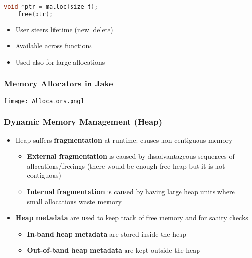 \begin{lstlisting}[language={C}]
    void *ptr = malloc(size_t);
    free(ptr);                  
\end{lstlisting}
\begin{itemize}
    \item User steers lifetime (new, delete)
    \item Available across functions
    \item Used also for large allocations
\end{itemize}

\subsubsection{Memory Allocators in Jake}
\begin{center}
    \texttt{[image: Allocators.png]}
\end{center}

\subsubsection{Dynamic Memory Management (Heap)}
\begin{itemize}
    \item Heap suffers \textbf{fragmentation} at runtime: causes non-contiguous memory
          \noindent\begin{itemize}
              \item \textbf{External fragmentation} is caused by disadvantageous sequences of allocations/freeings (there would be enough free heap but it is not contiguous)
              \item \textbf{Internal fragmentation} is caused by having large heap units where small allocations waste memory
          \end{itemize}
    \item \textbf{Heap metadata} are used to keep track of free memory and for sanity checks
          \noindent\begin{itemize}
              \item \textbf{In-band heap metadata} are stored inside the heap
              \item \textbf{Out-of-band heap metadata} are kept outside the heap
          \end{itemize}
\end{itemize}

